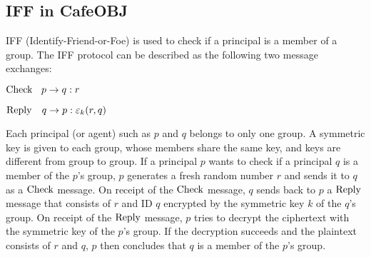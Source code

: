 \documentclass[a4paper,fleqn]{cas-dc}
\begin{document}
\subsection{IFF in CafeOBJ}
IFF (Identify-Friend-or-Foe) \cite{iff2001} is used to check if a principal is a member of a group. The IFF protocol can be described as the following two message exchanges:
	
	${\rm Check} \ \ \: p \rightarrow q : r$
	
	${\rm Reply}  \ \ \ q \rightarrow p : \varepsilon_k(r,q)$
	
	\noindent
Each principal (or agent) such as $p$ and $q$ belongs to only one group. A symmetric key is given to each group, whose members share the same key, and keys are different from group to group. If a principal $p$ wants to check if a principal $q$ is a member of the $p$'s group, $p$ generates a fresh random number $r$ and sends it to $q$ as a $\rm Check$ message. 
On receipt of the $\rm Check$ message, $q$ sends back to $p$ a $\rm Reply$ message that consists of $r$ and ID $q$ encrypted by the symmetric key $k$ of the $q$'s group. On receipt of the $\rm Reply$ message, $p$ tries to decrypt the ciphertext with the symmetric key of the $p$'s group. If the decryption succeeds and the plaintext consists of $r$ and $q$, $p$ then concludes that $q$ is a member of the $p$'s group. 
	
\end{document}
